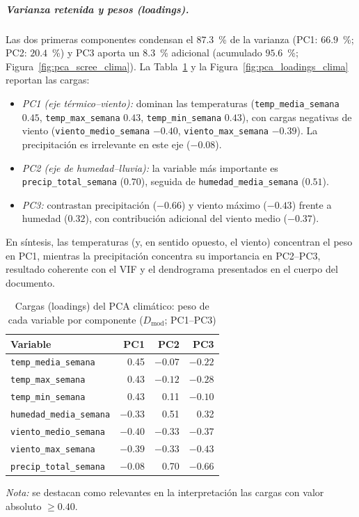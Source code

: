 \subparagraph{Varianza retenida y pesos (loadings).} Las dos primeras componentes condensan el $87{.}3$~\% de la varianza (PC1: $66{.}9$~\%; PC2: $20{.}4$~\%) y PC3 aporta un $8{.}3$~\% adicional (acumulado $95{.}6$~\%; Figura~\ref{fig:pca_scree_clima}). La Tabla~\ref{tab:pca_loadings_clima} y la Figura~\ref{fig:pca_loadings_clima} reportan las cargas:
\begin{itemize}
    \item \textit{PC1 (eje térmico--viento):} dominan las temperaturas (\texttt{temp\_media\_semana} $0{.}45$, \texttt{temp\_max\_semana} $0{.}43$, \texttt{temp\_min\_semana} $0{.}43$), con cargas negativas de viento (\texttt{viento\_medio\_semana} $-0{.}40$, \texttt{viento\_max\_semana} $-0{.}39$). La precipitación es irrelevante en este eje ($-0{.}08$).
    \item \textit{PC2 (eje de humedad--lluvia):} la variable más importante es \texttt{precip\_total\_semana} ($0{.}70$), seguida de \texttt{humedad\_media\_semana} ($0{.}51$).
    \item \textit{PC3:} contrastan precipitación ($-0{.}66$) y viento máximo ($-0{.}43$) frente a humedad ($0{.}32$), con contribución adicional del viento medio ($-0{.}37$).
\end{itemize}
En síntesis, las temperaturas (y, en sentido opuesto, el viento) concentran el peso en PC1, mientras la precipitación concentra su importancia en PC2--PC3, resultado coherente con el VIF y el dendrograma presentados en el cuerpo del documento.

\begin{table}[!htbp]
\centering
\small
\caption{Cargas (loadings) del PCA climático: peso de cada variable por componente ($D_{\mathrm{mod}}$; PC1--PC3)}
\label{tab:pca_loadings_clima}
\begin{tabular}{@{}l r r r@{}}
\toprule
\textbf{Variable} & \textbf{PC1} & \textbf{PC2} & \textbf{PC3} \\
\midrule
\texttt{temp\_media\_semana}    &  0.45 & $-0.07$ & $-0.22$ \\
\texttt{temp\_max\_semana}      &  0.43 & $-0.12$ & $-0.28$ \\
\texttt{temp\_min\_semana}      &  0.43 &  0.11  & $-0.10$ \\
\texttt{humedad\_media\_semana} & $-0.33$ &  0.51  &  0.32  \\
\texttt{viento\_medio\_semana}  & $-0.40$ & $-0.33$ & $-0.37$ \\
\texttt{viento\_max\_semana}    & $-0.39$ & $-0.33$ & $-0.43$ \\
\texttt{precip\_total\_semana}  & $-0.08$ &  0.70  & $-0.66$ \\
\bottomrule
\end{tabular}

\noindent\textit{Nota:} se destacan como relevantes en la interpretación las cargas con valor absoluto $\geq 0{.}40$.
\end{table}

